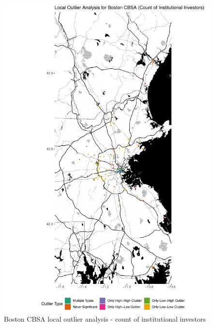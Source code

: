 \begin{figure}
	\centering
	\includegraphics[width=1\linewidth]{Figures/ChapterIV/Bos_Count_LO}
	\caption[Boston CBSA Local Outlier Analysis - Count of Institutional Investors 1999-2018]{Boston CBSA local outlier analysis - count of institutional investors}
	\label{fig:bostoncountlocaloutliercount}
\end{figure}

